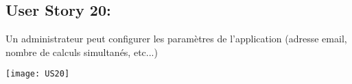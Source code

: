\newpage{}
\subsection{User Story 20:}
Un administrateur peut configurer les paramètres de l'application (adresse email, nombre de calculs simultanés, etc...)


  \begin{center}
        \texttt{[image: US20]}
  \end{center}